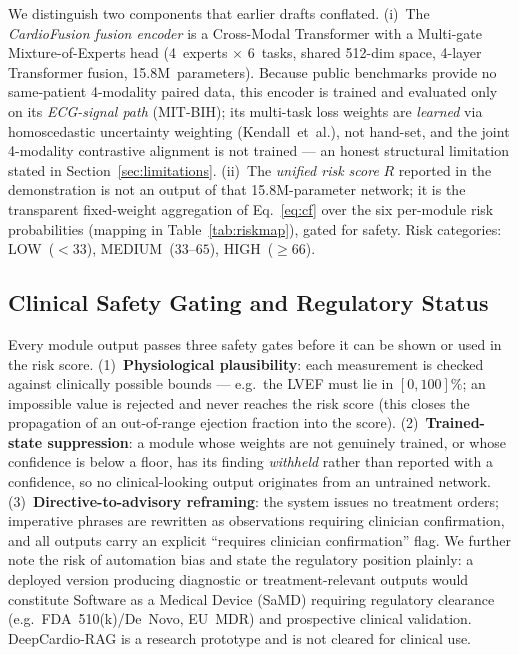 \documentclass[AMA,STIX1COL,]{WileyNJD-v2}
\begin{document}
We distinguish two components that earlier drafts conflated. (i)~The
\emph{CardioFusion fusion encoder} is a Cross-Modal Transformer with a
Multi-gate Mixture-of-Experts head (4~experts $\times$ 6~tasks, shared
512-dim space, 4-layer Transformer fusion, 15.8M~parameters). Because
public benchmarks provide no same-patient 4-modality paired data, this
encoder is trained and evaluated only on its \emph{ECG-signal path}
(MIT-BIH); its multi-task loss weights are \emph{learned} via
homoscedastic uncertainty weighting (Kendall~et~al.), not hand-set, and
the joint 4-modality contrastive alignment is not trained --- an honest
structural limitation stated in Section~\ref{sec:limitations}. (ii)~The
\emph{unified risk score} $R$ reported in the demonstration is not an
output of that 15.8M-parameter network; it is the transparent
fixed-weight aggregation of Eq.~\eqref{eq:cf} over the six per-module
risk probabilities (mapping in Table~\ref{tab:riskmap}), gated for
safety. Risk categories: LOW~($<33$), MEDIUM~($33$--$65$),
HIGH~($\geq 66$).

\subsection{Clinical Safety Gating and Regulatory Status}
\label{sec:safety}

Every module output passes three safety gates before it can be shown or
used in the risk score. (1)~\textbf{Physiological plausibility}: each
measurement is checked against clinically possible bounds --- e.g.\ the
LVEF must lie in $[0,100]\%$; an impossible value is rejected and never
reaches the risk score (this closes the propagation of an out-of-range
ejection fraction into the score). (2)~\textbf{Trained-state
suppression}: a module whose weights are not genuinely trained, or whose
confidence is below a floor, has its finding \emph{withheld} rather than
reported with a confidence, so no clinical-looking output originates
from an untrained network. (3)~\textbf{Directive-to-advisory
reframing}: the system issues no treatment orders; imperative phrases
are rewritten as observations requiring clinician confirmation, and all
outputs carry an explicit ``requires clinician confirmation'' flag. We
further note the risk of automation bias and state the regulatory
position plainly: a deployed version producing diagnostic or
treatment-relevant outputs would constitute Software as a Medical Device
(SaMD) requiring regulatory clearance (e.g.\ FDA~510(k)/De~Novo, EU~MDR)
and prospective clinical validation. DeepCardio-RAG is a research
prototype and is not cleared for clinical use.
\end{document}
